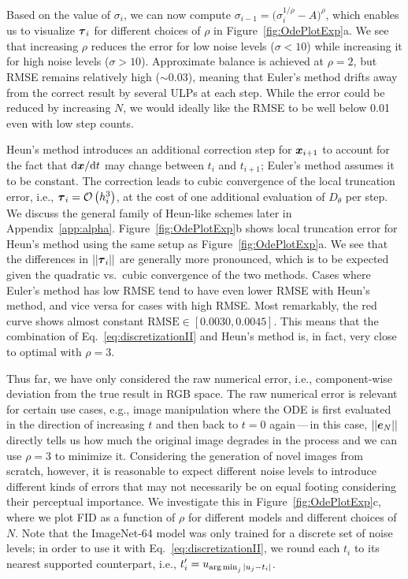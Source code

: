 Based on the value of $\sigma_i$, we can now compute $\sigma_{i-1} = \big( \sigma_i^{1 / \rho} - A \big)^\rho$, which enables us to visualize $\boldsymbol{\tau}_i$ for different choices of $\rho$ in Figure~\ref{fig:OdePlotExp}a.
We see that increasing $\rho$ reduces the error for low noise levels ($\sigma < 10$) while increasing it for high noise levels ($\sigma > 10$).
Approximate balance is achieved at $\rho=2$, but RMSE remains relatively high ($\sim0.03$), meaning that Euler's method drifts away from the correct result by several ULPs at each step.
While the error could be reduced by increasing $N$, we would ideally like the RMSE to be well below 0.01 even with low step counts.

Heun's method introduces an additional correction step for $\boldsymbol{x}_{i+1}$ to account for the fact that $\mathrm{d}\boldsymbol{x} / \mathrm{d}t$ may change between $t_i$ and $t_{i+1}$; Euler's method assumes it to be constant.
The correction leads to cubic convergence of the local truncation error, i.e., $\boldsymbol{\tau}_i = \mathcal{O}\left(h_i^3\right)$, at the cost of one additional evaluation of $D_\theta$ per step.
We discuss the general family of Heun-like schemes later in Appendix~\ref{app:alpha}.
Figure~\ref{fig:OdePlotExp}b shows local truncation error for Heun's method using the same setup as Figure~\ref{fig:OdePlotExp}a.
We see that the differences in $||\boldsymbol{\tau}_i||$ are generally more pronounced, which is to be expected given the quadratic vs.~cubic convergence of the two methods.
Cases where Euler's method has low RMSE tend to have even lower RMSE with Heun's method, and vice versa for cases with high RMSE.
Most remarkably, the red curve shows almost constant $\text{RMSE} \in [0.0030, 0.0045]$.
This means that the combination of Eq.~\ref{eq:discretizationII} and Heun's method is, in fact, very close to optimal with $\rho=3$.

Thus far, we have only considered the raw numerical error, i.e., component-wise deviation from the true result in RGB space.
The raw numerical error is relevant for certain use cases, e.g., image manipulation where the ODE is first evaluated in the direction of increasing $t$ and then back to $t=0$ again\,---\,in this case, $||\boldsymbol{e}_N||$ directly tells us how much the original image degrades in the process and we can use $\rho=3$ to minimize it.
Considering the generation of novel images from scratch, however, it is reasonable to expect different noise levels to introduce different kinds of errors that may not necessarily be on equal footing considering their perceptual importance.
We investigate this in Figure~\ref{fig:OdePlotExp}c, where we plot FID as a function of $\rho$ for different models and different choices of $N$.
Note that the ImageNet-64 model was only trained for a discrete set of noise levels; in order to use it with Eq.~\ref{eq:discretizationII}, we round each $t_i$ to its nearest supported counterpart, i.e., $t'_i = u_{\operatorname{arg\,min}_j |u_j - t_i|}$.

